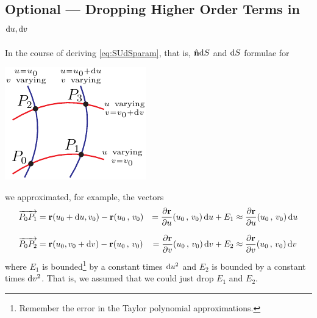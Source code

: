 \begin{eg}

\end{eg}



\subsection{Optional --- Dropping Higher Order Terms in $\mathrm{d}u,\mathrm{d}v$}\label{sec:hoterms}
In the course of deriving \eqref{eq:SUdSparam}, that is,
$\hat{\mathbf{n}}\mathrm{d}S$ and $\mathrm{d}S$ formulae for 
\begin{nfig}
\begin{center}
    \includegraphics{dS.pdf}
\end{center}
\end{nfig}
we approximated, for example, the vectors
\begin{alignat*}{3}
\overrightarrow{P_0P_1}
&=\mathbf{r}(u_0+\mathrm{d}u, v_0) -\mathbf{r}(u_0\,,\,v_0) 
&= \frac{\partial\mathbf{r}}{\partial u}(u_0\,,\,v_0)\,\mathrm{d}u + E_1
&\approx \frac{\partial\mathbf{r}}{\partial u}(u_0\,,\,v_0)\,\mathrm{d}u  \\[0.1in]
\overrightarrow{P_0P_2}
&=\mathbf{r}(u_0, v_0+\mathrm{d}v)-\mathbf{r}(u_0\,,\,v_0) 
&= \frac{\partial\mathbf{r}}{\partial v}(u_0\,,\,v_0)\,\mathrm{d}v  + E_2
&\approx \frac{\partial\mathbf{r}}{\partial v}(u_0\,,\,v_0)\,\mathrm{d}v  
\end{alignat*}
where $E_1$ is bounded\footnote{Remember the error in the Taylor polynomial 
approximations.} by a constant times $\mathrm{d}u^2$
and $E_2$ is bounded by a constant times $\mathrm{d}v^2$. That is, we assumed 
that we could just drop $E_1$ and $E_2$. 

